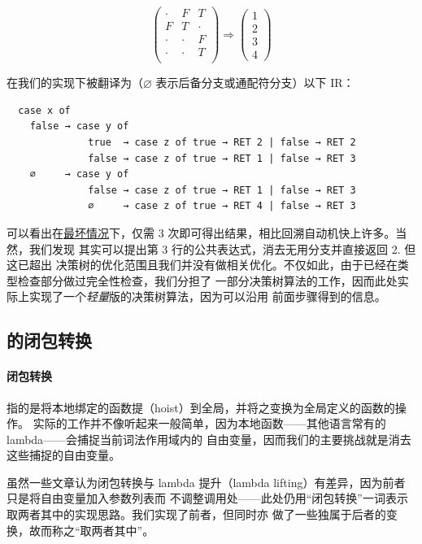 \documentclass[a4paper, 11pt]{article}
\theoremstyle{remark}\newtheorem*{remark}{Remark}
\theoremstyle{definition}\newtheorem*{definition}{Definition}
\begin{document}
\[
  \begin{pmatrix}
    \cdot & F & T \\
    F & T & \cdot \\
    \cdot & \cdot & F \\
    \cdot & \cdot & T \\
  \end{pmatrix}\Longrightarrow
  \begin{pmatrix}
    1 \\ 2 \\ 3 \\ 4
  \end{pmatrix}
\]

在我们的实现下被翻译为（$\varnothing$ 表示后备分支或通配符分支）以下 IR：

\begin{verbatim}
  case x of
    false → case y of
              true  → case z of true → RET 2 | false → RET 2
              false → case z of true → RET 1 | false → RET 3
    ∅     → case y of
              false → case z of true → RET 1 | false → RET 3
              ∅     → case z of true → RET 4 | false → RET 3
\end{verbatim}

可以看出在\underline{最坏情况}下，仅需 3 次即可得出结果，相比回溯自动机快上许多。当然，我们发现
其实可以提出第 3 行的公共表达式，消去无用分支并直接返回 2. 但这已超出
决策树的优化范围且我们并没有做相关优化。不仅如此，由于已经在类型检查部分做过完全性检查，我们分担了
一部分决策树算法的工作，因而此处实际上实现了一个\emph{轻量}版的决策树算法，因为可以沿用
前面步骤得到的信息。

\subsection{\Lambdair 的闭包转换}

\paragraph{闭包转换} 指的是将本地绑定的函数提（hoist）到全局，并将之变换为全局定义的函数的操作。
实际的工作并不像听起来一般简单，因为本地函数——其他语言常有的 lambda——会捕捉当前词法作用域内的
自由变量，因而我们的主要挑战就是消去这些捕捉的自由变量。

虽然一些文章认为闭包转换与 lambda 提升（lambda lifting）有差异，因为前者只是将自由变量加入参数列表而
不调整调用处——此处仍用“闭包转换”一词表示 \Tigris 取两者其中的实现思路。我们实现了前者，但同时亦
做了一些独属于后者的变换，故而称之“取两者其中”。
\end{document}
